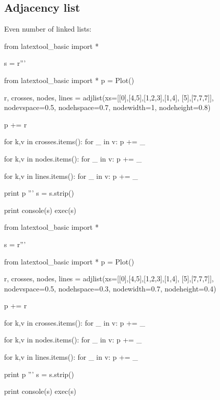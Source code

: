 \subsection{Adjacency list}


Even number of linked lists:

\begin{python}
from latextool_basic import *

s = r'''

from latextool_basic import *
p = Plot()

r, crosses, nodes, lines = adjlist(xs=[[0],[4,5],[1,2,3],[1,4], [5],[7,7,7]],
                                   nodevspace=0.5, nodehspace=0.7,
                                   nodewidth=1, nodeheight=0.8)

p += r

for k,v in crosses.items():
    for _ in v: p += _

for k,v in nodes.items():
    for _ in v: p += _

for k,v in lines.items():
    for _ in v: p += _

print p
'''
s = s.strip()

print console(s)
exec(s)
\end{python}


\begin{python}
from latextool_basic import *

s = r'''

from latextool_basic import *
p = Plot()

r, crosses, nodes, lines = adjlist(xs=[[0],[4,5],[1,2,3],[1,4], [5],[7,7,7]],
                                   nodevspace=0.5, nodehspace=0.3,
                                   nodewidth=0.7, nodeheight=0.4)

p += r

for k,v in crosses.items():
    for _ in v: p += _

for k,v in nodes.items():
    for _ in v: p += _

for k,v in lines.items():
    for _ in v: p += _

print p
'''
s = s.strip()

print console(s)
exec(s)
\end{python}





